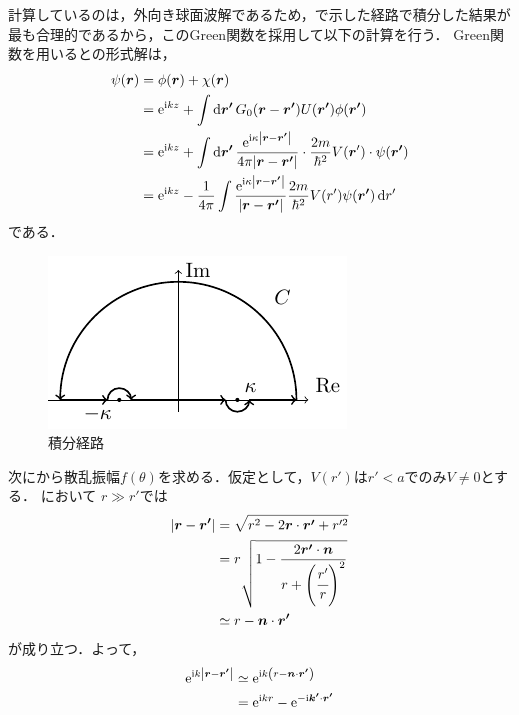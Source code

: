 \documentclass{report}
\begin{document}
    計算しているのは，外向き球面波解であるため，で示した経路で積分した結果が最も合理的であるから，このGreen関数を採用して以下の計算を行う．
    Green関数を用いるとの形式解は，
    \begin{align}
      \psi(\bm{r}) &= \phi(\bm{r}) + \chi(\bm{r}) \\ 
      &= \mathrm{e}^{\mathrm{i} kz} + \int\dd{\bm{r'}} G_0(\bm{r} - \bm{r'}) U(\bm{r'}) \phi(\bm{r'}) \\ 
      &= \mathrm{e}^{\mathrm{i} kz} + \int\dd{\bm{r'}} \frac{\mathrm{e}^{\mathrm{i}\kappa \abs{\bm{r} - \bm{r'}}}}{4\pi \abs{\bm{r} - \bm{r'}}} \cdot \frac{2m}{\hbar^2} V(\bm{r}') \cdot \psi(\bm{r'}) \\ 
      &= \mathrm{e}^{\mathrm{i} kz} - \frac{1}{4\pi} \int \frac{\mathrm{e}^{\mathrm{i} \kappa \abs{\bm{r} - \bm{r'}}}}{\abs{\bm{r} - \bm{r'}}} \frac{2m}{\hbar^2}V(r')\psi(\bm{r'}) \dd{r'}\label{formal-soultion}
    \end{align}
    である．
    \begin{figure}[H]
      \centering
      \includegraphics[width = 0.7\columnwidth]{fig/integral-green-tex.pdf}
      \caption{積分経路}\label{Integral}
    \end{figure}
    \par
    次にから散乱振幅$f(\theta)$を求める．仮定として，$V(r')$は$r'<a$でのみ$V\neq 0$とする．
    において
    $r \gg r'$では
    \begin{align}
      \abs{\bm{r} - \bm{r'}} &= \sqrt{r^2 - 2\bm{r} \cdot \bm{r'} + r'^2}\\
      &= r \sqrt{1 - \frac{2\bm{r'} \cdot \bm{n}}{r + \qty(\cfrac{r'}{r})^2}}\\
      &\simeq r - \bm{n}\cdot\bm{r'}
    \end{align}
    が成り立つ．よって，
    \begin{align}
      \mathrm{e}^{\mathrm{i} k \abs{\bm{r} - \bm{r'}}} &\simeq \mathrm{e}^{\mathrm{i} k \qty(r - \bm{n} \cdot \bm{r'})}\\
      &= \mathrm{e}^{\mathrm{i} k r} - \mathrm{e}^{-\mathrm{i} \bm{k'} \cdot \bm{r'}}
    \end{align}
\end{document}
